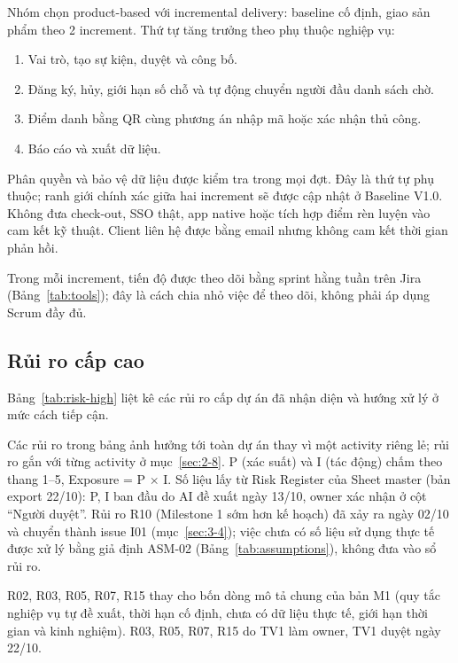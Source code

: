 Nhóm chọn product-based với incremental delivery: baseline cố định, giao sản phẩm theo 2 increment. Thứ tự tăng trưởng theo phụ thuộc nghiệp vụ:
\begin{enumerate}
  \item Vai trò, tạo sự kiện, duyệt và công bố.
  \item Đăng ký, hủy, giới hạn số chỗ và tự động chuyển người đầu danh sách chờ.
  \item Điểm danh bằng QR cùng phương án nhập mã hoặc xác nhận thủ công.
  \item Báo cáo và xuất dữ liệu.
\end{enumerate}
Phân quyền và bảo vệ dữ liệu được kiểm tra trong mọi đợt. Đây là thứ tự phụ thuộc; ranh giới chính xác giữa hai increment sẽ được cập nhật ở Baseline V1.0. Không đưa check-out, SSO thật, app native hoặc tích hợp điểm rèn luyện vào cam kết kỹ thuật. Client liên hệ được bằng email nhưng không cam kết thời gian phản hồi.

Trong mỗi increment, tiến độ được theo dõi bằng sprint hằng tuần trên Jira (Bảng~\ref{tab:tools}); đây là cách chia nhỏ việc để theo dõi, không phải áp dụng Scrum đầy đủ.

\subsection*{Rủi ro cấp cao}
Bảng~\ref{tab:risk-high} liệt kê các rủi ro cấp dự án đã nhận diện và hướng xử lý ở mức cách tiếp cận.

Các rủi ro trong bảng ảnh hưởng tới toàn dự án thay vì một activity riêng lẻ; rủi ro gắn với từng activity ở mục~\ref{sec:2-8}. P (xác suất) và I (tác động) chấm theo thang 1--5, Exposure = P $\times$ I. Số liệu lấy từ Risk Register của Sheet master (bản export 22/10): P, I ban đầu do AI đề xuất ngày 13/10, owner xác nhận ở cột \enquote{Người duyệt}. Rủi ro R10 (Milestone 1 sớm hơn kế hoạch) đã xảy ra ngày 02/10 và chuyển thành issue I01 (mục~\ref{sec:3-4}); việc chưa có số liệu sử dụng thực tế được xử lý bằng giả định ASM-02 (Bảng~\ref{tab:assumptions}), không đưa vào sổ rủi ro.

R02, R03, R05, R07, R15 thay cho bốn dòng mô tả chung của bản M1 (quy tắc nghiệp vụ tự đề xuất, thời hạn cố định, chưa có dữ liệu thực tế, giới hạn thời gian và kinh nghiệm). R03, R05, R07, R15 do TV1 làm owner, TV1 duyệt ngày 22/10.

